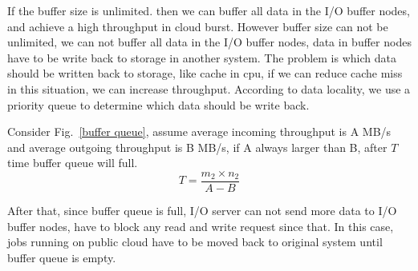 If the buffer size is unlimited. then we can buffer all data in the I/O buffer nodes, and achieve a high throughput in cloud burst.
However buffer size can not be unlimited, we can not buffer all data in the I/O buffer nodes, data in buffer nodes have to be write back to storage in another system.
The problem is which data should be written back to storage, like cache in cpu, if we can reduce cache miss in this situation, we can increase throughput. 
According to data locality, we use a priority queue to determine which data should be write back.

Consider Fig.~\ref{buffer queue}, assume average incoming throughput is A MB/s and average outgoing throughput is B MB/s, if A always larger than B, after $T$ time buffer queue will full.
\[T=\frac{m_2\times n_2}{A-B}\]

After that, since buffer queue is full, I/O server can not send more data to I/O buffer nodes, have to block any read and write request since that.
In this case, jobs running on public cloud have to be moved back to original system until buffer queue is empty.